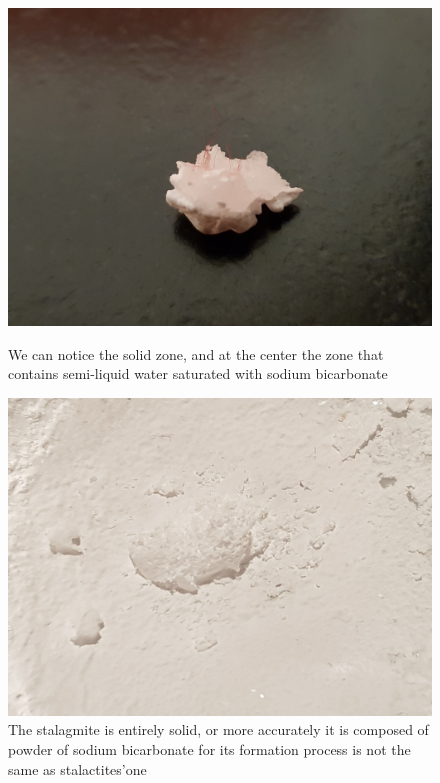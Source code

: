 \documentclass[draft, final]{report}
\begin{document}
  \begin{figure}[!ht]
      \begin{minipage}[c]{.46\linewidth}
          \centering
          \includegraphics[scale=0.06]{LateX/Images/stalactiteslice.jpg}
          \caption{We can notice the solid zone, and at the center the zone that contains semi-liquid water saturated with sodium bicarbonate}
      \end{minipage}
      \hfill%
      \begin{minipage}[c]{.46\linewidth}
          \centering
          \includegraphics[scale=0.06]{LateX/Images/stalagmiteexp.jpg}
          \caption{The stalagmite is entirely solid, or more accurately it is composed of powder of sodium bicarbonate for its formation process is not the same as stalactites'one}
      \end{minipage}
    \end{figure}
\end{document}
